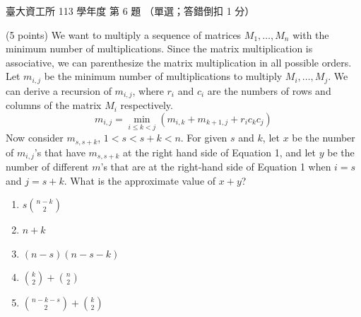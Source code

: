 \begin{pastexam}[label={px:ntu-113-dsa-06}]{臺大資工所 113 學年度 第 6 題}
（單選；答錯倒扣 1 分）

(5 points) We want to multiply a sequence of matrices $M_1,\ldots,M_n$ with the minimum number of
multiplications. Since the matrix multiplication is associative, we can parenthesize the matrix
multiplication in all possible orders. Let $m_{i,j}$ be the minimum number of multiplications to
multiply $M_i,\ldots,M_j$. We can derive a recursion of $m_{i,j}$, where $r_i$ and $c_i$ are the
numbers of rows and columns of the matrix $M_i$ respectively.
\begin{equation*}
m_{i,j}=\min_{i\le k<j}(m_{i,k}+m_{k+1,j}+r_ic_kc_j) \tag{1}
\end{equation*}
Now consider $m_{s,s+k}$, $1<s<s+k<n$. For given $s$ and $k$, let $x$ be the number of $m_{i,j}$'s
that have $m_{s,s+k}$ at the right hand side of Equation 1, and let $y$ be the number of different
$m$'s that are at the right-hand side of Equation 1 when $i=s$ and $j=s+k$. What is the approximate
value of $x+y$?
\begin{enumerate}[label=\Alph*.]
\item $s\binom{n-k}{2}$
\item $n+k$
\item $(n-s)(n-s-k)$
\item $\binom{k}{2}+\binom{n}{2}$
\item $\binom{n-k-s}{2}+\binom{k}{2}$
\end{enumerate}
\end{pastexam}

